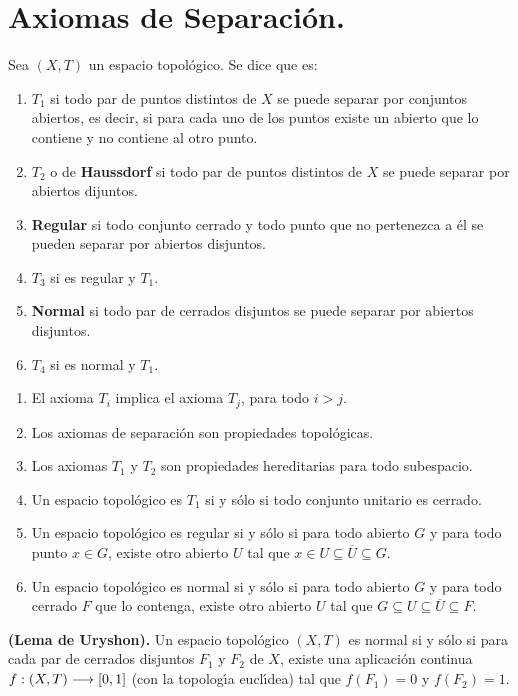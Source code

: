 \documentclass[cursovd_portada.tex]{subfiles}
\begin{document}
\section{Axiomas de Separaci\'{o}n.}
\begin{defi}
Sea $(X,T)$ un espacio topol\'{o}gico. Se dice que es:
\begin{enumerate}
\item $T_1$ si todo par de puntos distintos de $X$ se puede separar por conjuntos abiertos, es decir, si para cada
uno de los puntos existe un abierto que lo contiene y no contiene al otro punto.
\item $T_2$ o de {\bf Haussdorf} si todo par de puntos distintos de $X$ se puede separar por abiertos dijuntos.
\item {\bf Regular} si todo conjunto cerrado y todo punto que no pertenezca a \'{e}l se pueden separar por abiertos
disjuntos.
\item $T_3$ si es regular y $T_1$.
\item {\bf Normal} si todo par de cerrados disjuntos se puede separar por abiertos disjuntos.
\item $T_4$ si es normal y $T_1$.
\end{enumerate}
\end{defi}
\begin{prop}
\begin{enumerate}
\item El axioma $T_i$ implica el axioma $T_j$, para todo $i>j$.
\item Los axiomas de separaci\'{o}n son propiedades topol\'{o}gicas.
\item Los axiomas $T_1$ y $T_2$ son propiedades hereditarias para todo subespacio.
\item Un espacio topol\'{o}gico es $T_1$ si y s\'{o}lo si todo conjunto unitario es cerrado.
\item Un espacio topol\'{o}gico es regular si y s\'{o}lo si para todo abierto $G$ y para todo punto $x\in G$,
existe otro abierto $U$ tal que $x\in U\subseteq\overline{U}\subseteq G$.
\item Un espacio topol\'{o}gico es normal si y s\'{o}lo si para todo abierto $G$ y para todo cerrado $F$ que lo contenga,
existe otro abierto $U$ tal que $G\subseteq U\subseteq\overline{U}\subseteq F$.
\end{enumerate}
\end{prop}
\begin{teorema}
{\bf (Lema de Uryshon).} Un espacio topol\'{o}gico $(X,T)$ es normal si y s\'{o}lo si para cada par de cerrados disjuntos
$F_1$ y $F_2$ de $X$, existe una aplicaci\'{o}n continua $f:(X,T)\longrightarrow [0,1]$ (con la topolog\'{\i}a eucl\'{\i}dea) tal que
$f(F_1)=0$ y $f(F_2)=1$.
\end{teorema}
\end{document}
